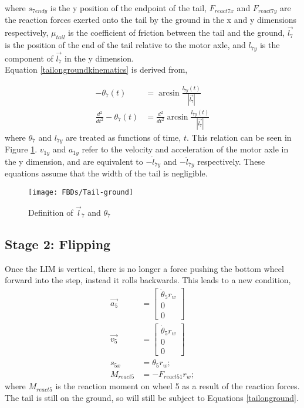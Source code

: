 where $s_{7endy}$ is the y position of the endpoint of the tail, $F_{react7x}$ and $F_{react7y}$ are the reaction forces exerted onto the tail by the ground in the x and y dimensions respectively, $\mu_{tail}$ is the coefficient of friction between the tail and the ground, $\vec{l_7}$ is the position of the end of the tail relative to the motor axle, and $l_{7y}$ is the component of $\vec{l_7}$ in the y dimension. \\
Equation \ref{tailongroundkinematics} is derived from,

\begin{subequations}
	\begin{align}
		-\theta_7(t) &= \arcsin{\frac{l_{7y}(t)}{|\vec{l_7}|}}\\
		\frac{d^2}{dt^2}-\theta_7(t) &= \frac{d^2}{dt^2}\arcsin{\frac{l_{7y}(t)}{|\vec{l_7}|}}
	\end{align}
\end{subequations}
where $\theta_7$ and $l_{7y}$ are treated as functions of time, $t$. This relation can be seen in Figure \ref{fig:tailGround}. $v_{1y}$ and $a_{1y}$ refer to the velocity and acceleration of the motor axle in the y dimension, and are equivalent to $-\dot{l}_{7y}$ and $-\ddot{l}_{7y}$ respectively. These equations assume that the width of the tail is negligible.\\

\begin{figure}[!h]
	\centering
	\texttt{[image: FBDs/Tail-ground]}
	\caption{Definition of $\vec{l}_7$ and $\theta_7$}
	\label{fig:tailGround}
\end{figure}

\subsection*{Stage 2: Flipping}

Once the LIM is vertical, there is no longer a force pushing the bottom wheel forward into the step, instead it rolls backwards. This leads to a new condition,
\begin{subequations}
	\label{wheel1rolling}
	\begin{align}
		\vec{a_5} &= \begin{bmatrix}
			\ddot{\theta}_5 r_w \\
			0\\
			0
		\end{bmatrix}\\
		\vec{v_5} &= \begin{bmatrix}
			\dot{\theta}_5 r_w \\
			0\\
			0
		\end{bmatrix}\\
		s_{5x} &= \theta_{5} r_w;\\
		M_{react5} &= - F_{react51} r_w;
	\end{align}
\end{subequations}
where $M_{react5}$ is the reaction moment on wheel 5 as a result of the reaction forces.
The tail is still on the ground, so will still be subject to Equations \ref{tailonground}.

